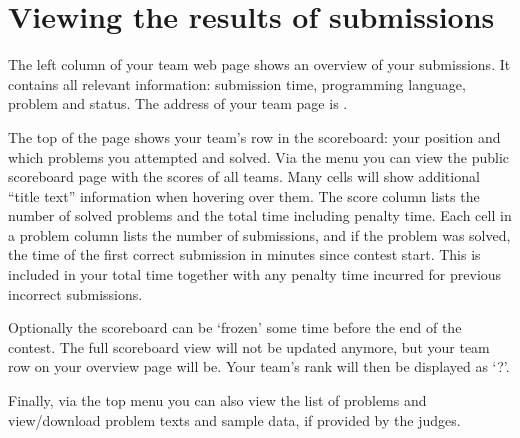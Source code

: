 \documentclass[a4paper,10pt,english,openany]{sphinxmanual}
\begin{document}
\section{Viewing the results of submissions}
\label{\detokenize{team:viewing-the-results-of-submissions}}
\sphinxAtStartPar
The left column of your team web page shows an overview of your submissions.
It contains all relevant information: submission time, programming
language, problem and status. The address of your team page is
.

\sphinxAtStartPar
The top of the page shows your team’s row in the scoreboard: your position and
which problems you attempted and solved. Via the menu you can view the public
scoreboard page with the scores of all teams. Many cells will show
additional “title text” information when hovering over them. The
score column lists the number of solved problems and the total time including
penalty time. Each cell in a problem column lists the number of submissions,
and if the problem was solved, the time of the first correct
submission in minutes since contest start. This is included in your
total time together with any penalty time incurred for previous
incorrect submissions.

\sphinxAtStartPar
Optionally the scoreboard can be ‘frozen’ some time before the end of the
contest. The full scoreboard view will not be updated anymore, but your
team row on your overview page will be. Your team’s rank will then be
displayed as ‘?’.

\sphinxAtStartPar
Finally, via the top menu you can also view the list of problems and
view/download problem texts and sample data, if provided by the judges.
\end{document}
